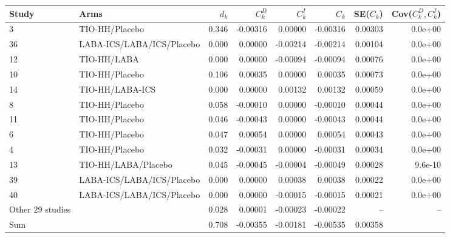 \begin{tabular}{llrrrrrr}
\toprule
Study & Arms & $d_k$ & $C^D_k$ & $C^I_k$ & $C_k$ & SE($C_k$) & Cov($C^D_k,C^I_k$) \\
\midrule
3 & TIO-HH/Placebo & 0.346 & -0.00316 & 0.00000 & -0.00316 & 0.00303 & 0.0e+00 \\
36 & LABA-ICS/LABA/ICS/Placebo & 0.000 & 0.00000 & -0.00214 & -0.00214 & 0.00104 & 0.0e+00 \\
12 & TIO-HH/LABA & 0.000 & 0.00000 & -0.00094 & -0.00094 & 0.00076 & 0.0e+00 \\
10 & TIO-HH/Placebo & 0.106 & 0.00035 & 0.00000 & 0.00035 & 0.00073 & 0.0e+00 \\
14 & TIO-HH/LABA-ICS & 0.000 & 0.00000 & 0.00132 & 0.00132 & 0.00059 & 0.0e+00 \\
8 & TIO-HH/Placebo & 0.058 & -0.00010 & 0.00000 & -0.00010 & 0.00044 & 0.0e+00 \\
11 & TIO-HH/Placebo & 0.046 & -0.00043 & 0.00000 & -0.00043 & 0.00044 & 0.0e+00 \\
6 & TIO-HH/Placebo & 0.047 & 0.00054 & 0.00000 & 0.00054 & 0.00043 & 0.0e+00 \\
4 & TIO-HH/Placebo & 0.032 & -0.00031 & 0.00000 & -0.00031 & 0.00034 & 0.0e+00 \\
13 & TIO-HH/LABA/Placebo & 0.045 & -0.00045 & -0.00004 & -0.00049 & 0.00028 & 9.6e-10 \\
39 & LABA-ICS/LABA/ICS/Placebo & 0.000 & 0.00000 & 0.00038 & 0.00038 & 0.00022 & 0.0e+00 \\
40 & LABA-ICS/LABA/ICS/Placebo & 0.000 & 0.00000 & -0.00015 & -0.00015 & 0.00021 & 0.0e+00 \\
Other 29 studies & & 0.028 & 0.00001 & -0.00023 & -0.00022 & -- & -- \\
\midrule
Sum & & 0.708 & -0.00355 & -0.00181 & -0.00535 & 0.00358 & \\
\bottomrule
\end{tabular}
